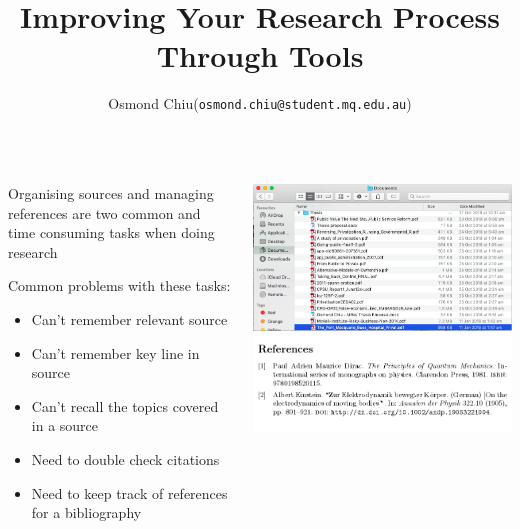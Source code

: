 \documentclass[unknownkeysallowed,usepdftitle=false, parskip=full, aspectratio=169]{beamer}
\title{Improving Your Research Process Through Tools}
\author{Osmond Chiu\inst (\texttt{osmond.chiu@student.mq.edu.au})}
\institute{Macquarie University}
\newcommand{\secvariable}{nothing}
\newcommand{\mysection}[1]{\renewcommand{\secvariable}{#1}
}
\begin{document}
\mysection{abstract}
\begin{frame}\label{\secvariable}

\parbox{\linewidth}{

\begin{columns}[t]
    \begin{column}[c]{0.5\textwidth}

Organising sources and managing references are two common and time consuming tasks when doing research

 \vspace{12pt}

Common problems with these tasks:
\begin{itemize}
\item Can't remember relevant source
\item Can't remember key line in source
\item Can't recall the topics covered in a source
\item Need to double check citations
\item Need to keep track of references for a bibliography
\end{itemize}

 \end{column}
    \begin{column}[c]{0.5\textwidth}
\includegraphics[width=1.5\textwidth,height=0.55\textheight,keepaspectratio]{figure/pdf.png}\\
\includegraphics[width=1.05\textwidth,height=0.5\textheight,keepaspectratio]{figure/bibliography.png}\\


\end{column}
\end{columns}}
\end{frame}
\end{document}
